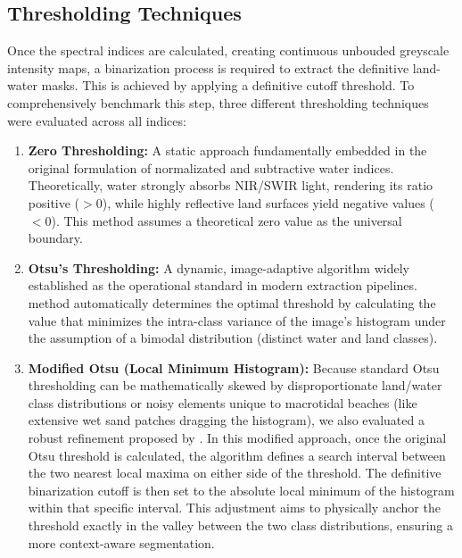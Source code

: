 ﻿\documentclass[ENG]{TFUOC}%
\begin{document}
\subsection{Thresholding Techniques}

Once the spectral indices are calculated, creating continuous unbouded greyscale intensity maps, a binarization process is required to extract the definitive land-water masks. This is achieved by applying a definitive cutoff threshold. To comprehensively benchmark this step, three different thresholding techniques were evaluated across all indices:

\begin{enumerate}
    \item \textbf{Zero Thresholding:} A static approach fundamentally embedded in the original formulation of normalizated and subtractive water indices. Theoretically, water strongly absorbs NIR/SWIR light, rendering its ratio positive ($>0$), while highly reflective land surfaces yield negative values ($<0$). This method assumes a theoretical zero value as the universal boundary.
    
    \item \textbf{Otsu's Thresholding:} A dynamic, image-adaptive algorithm widely established as the operational standard in modern extraction pipelines. \citet{otsu_threshold_1979} method automatically determines the optimal threshold by calculating the value that minimizes the intra-class variance of the image's histogram under the assumption of a bimodal distribution (distinct water and land classes).

    \item \textbf{Modified Otsu (Local Minimum Histogram):} Because standard Otsu thresholding can be mathematically skewed by disproportionate land/water class distributions or noisy elements unique to macrotidal beaches (like extensive wet sand patches dragging the histogram), we also evaluated a robust refinement proposed by \citet{bergsma_shoreliner_2024}. In this modified approach, once the original Otsu threshold is calculated, the algorithm defines a search interval between the two nearest local maxima on either side of the threshold. The definitive binarization cutoff is then set to the absolute local minimum of the histogram within that specific interval. This adjustment aims to physically anchor the threshold exactly in the valley between the two class distributions, ensuring a more context-aware segmentation.
\end{enumerate}
\end{document}
